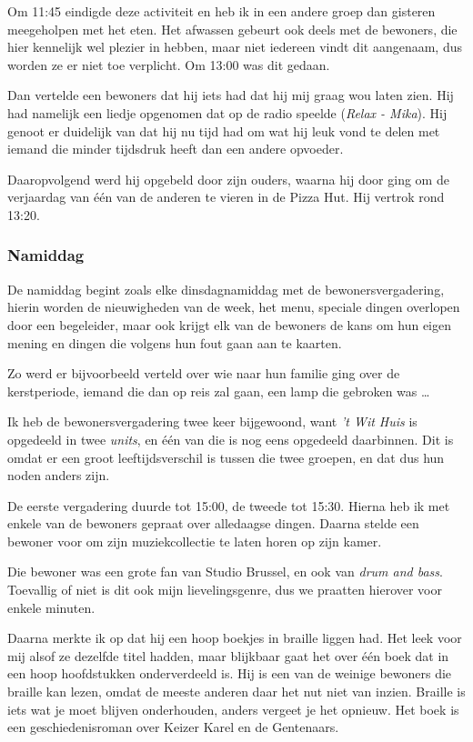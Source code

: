 \documentclass[a4paper,12pt]{article}
\begin{document}
Om 11:45 eindigde deze activiteit en heb ik in een andere groep dan gisteren meegeholpen met het eten. Het afwassen gebeurt ook deels met de bewoners, die hier kennelijk wel plezier in hebben, maar niet iedereen vindt dit aangenaam, dus worden ze er niet toe verplicht. Om 13:00 was dit gedaan.

Dan vertelde een bewoners dat hij iets had dat hij mij graag wou laten zien. Hij had namelijk een liedje opgenomen dat op de radio speelde (\emph{Relax - Mika}). Hij genoot er duidelijk van dat hij nu tijd had om wat hij leuk vond te delen met iemand die minder tijdsdruk heeft dan een andere opvoeder.

Daaropvolgend werd hij opgebeld door zijn ouders, waarna hij door ging om de verjaardag van één van de anderen te vieren in de Pizza Hut. Hij vertrok rond 13:20.

\subsubsection{Namiddag}

De namiddag begint zoals elke dinsdagnamiddag met de bewonersvergadering, hierin worden de nieuwigheden van de week, het menu, speciale dingen overlopen door een begeleider, maar ook krijgt elk van de bewoners de kans om hun eigen mening en dingen die volgens hun fout gaan aan te kaarten.

Zo werd er bijvoorbeeld verteld over wie naar hun familie ging over de kerstperiode, iemand die dan op reis zal gaan, een lamp die gebroken was \dots

Ik heb de bewonersvergadering twee keer bijgewoond, want \emph{'t Wit Huis} is opgedeeld in twee \emph{units}, en één van die is nog eens opgedeeld daarbinnen. Dit is omdat er een groot leeftijdsverschil is tussen die twee groepen, en dat dus hun noden anders zijn.

De eerste vergadering duurde tot 15:00, de tweede tot 15:30. Hierna heb ik met enkele van de bewoners gepraat over alledaagse dingen. Daarna stelde een bewoner voor om zijn muziekcollectie te laten horen op zijn kamer.

Die bewoner was een grote fan van Studio Brussel, en ook van \emph{drum and bass}. Toevallig of niet is dit ook mijn lievelingsgenre, dus we praatten hierover voor enkele minuten.

Daarna merkte ik op dat hij een hoop boekjes in braille liggen had. Het leek voor mij alsof ze dezelfde titel hadden, maar blijkbaar gaat het over één boek dat in een hoop hoofdstukken onderverdeeld is. Hij is een van de weinige bewoners die braille kan lezen, omdat de meeste anderen daar het nut niet van inzien. Braille is iets wat je moet blijven onderhouden, anders vergeet je het opnieuw. Het boek is een geschiedenisroman over Keizer Karel en de Gentenaars.
\end{document}
